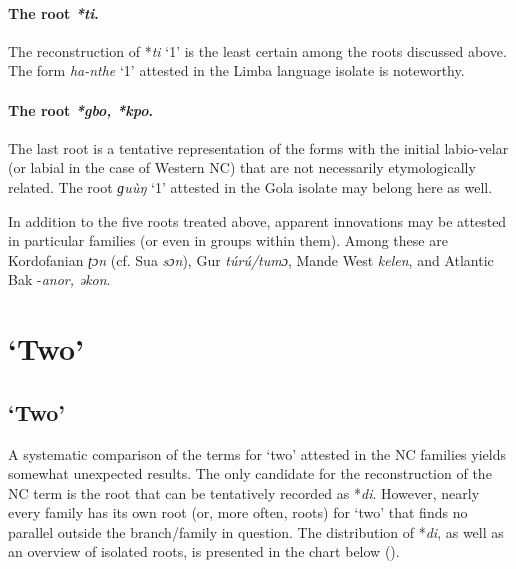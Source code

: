 \paragraph*{The root \textit{*ti}.}The reconstruction of *\textit{ti} ‘1’ is the least certain among the roots discussed above. The form \textit{ha-nthe} ‘1’ attested in the Limba language isolate is noteworthy.

\paragraph*{The root \textit{*gbo, *kpo}.} The last root is a tentative representation of the forms with the initial labio-velar (or labial in the case of Western NC) that are not necessarily etymologically related. The root \textit{ɡu{\`{u}}ŋ} ‘1’ attested in the Gola isolate may belong here as well. 

In addition to the five roots treated above, apparent innovations may be attested in particular families (or even in groups within them). Among these are Kordofanian \textit{ʈɔn} (cf. Sua \textit{sɔn}), Gur \textit{túrú/tumɔ}, Mande West \textit{kelen}, and Atlantic Bak -\textit{anor,} \textit{əkon}.


\section{‘Two’}%
\largerpage
\subsection{‘Two’}%
A systematic comparison of the terms for ‘two’ attested in the NC families yields somewhat unexpected results. The only candidate for the reconstruction of the NC term is the root that can be tentatively recorded as *\textit{di}. However, nearly every family has its own root (or, more often, roots) for ‘two’ that finds no parallel outside the branch/family in question. The distribution of *\textit{di}, as well as an overview of isolated roots, is presented in the chart below ().

